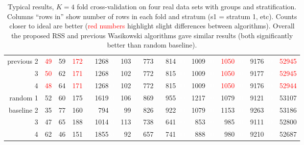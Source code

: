 \documentclass[twoside]{article}
\begin{document}
\begin{table}[ht]
\begin{tabular}{|r|rr|rr|rrrrr|rr|}
  previous 2 & \textcolor{red}{49} & 59 & \textcolor{red}{172}\textcolor{white}{.0} & 1268\textcolor{white}{.0} & 103\textcolor{white}{.0} & 773\textcolor{white}{.0} & 814\textcolor{white}{.00} & 1009\textcolor{white}{.00} & \textcolor{red}{1050}\textcolor{white}{.00} & 9176\textcolor{white}{.00} & \textcolor{red}{52945} \\ 
   3 & \textcolor{red}{50} & 62 & \textcolor{red}{171}\textcolor{white}{.0} & 1268\textcolor{white}{.0} & 102\textcolor{white}{.0} & 772\textcolor{white}{.0} & 815\textcolor{white}{.00} & 1009\textcolor{white}{.00} & \textcolor{red}{1050}\textcolor{white}{.00} & 9177\textcolor{white}{.00} & \textcolor{red}{52945} \\ 
   4 & \textcolor{red}{48} & 64 & \textcolor{red}{171}\textcolor{white}{.0} & 1268\textcolor{white}{.0} & 102\textcolor{white}{.0} & 772\textcolor{white}{.0} & 815\textcolor{white}{.00} & 1009\textcolor{white}{.00} & \textcolor{red}{1050}\textcolor{white}{.00} & 9176\textcolor{white}{.00} & \textcolor{red}{52944} \\ 
  \hline
  random 1 & 52 & 60 & 175\textcolor{white}{.0} & 1619\textcolor{white}{.0} & 106\textcolor{white}{.0} & 869\textcolor{white}{.0} & 955\textcolor{white}{.00} & 1217\textcolor{white}{.00} & 1079\textcolor{white}{.00} & 9121\textcolor{white}{.00} & 53107 \\ 
  baseline 2 & 35 & 77 & 160\textcolor{white}{.0} &  794\textcolor{white}{.0} &  99\textcolor{white}{.0} & 826\textcolor{white}{.0} & 922\textcolor{white}{.00} & 1079\textcolor{white}{.00} & 1153\textcolor{white}{.00} & 9263\textcolor{white}{.00} & 53186 \\ 
   3 & 47 & 65 & 188\textcolor{white}{.0} & 1014\textcolor{white}{.0} & 113\textcolor{white}{.0} & 738\textcolor{white}{.0} & 641\textcolor{white}{.00} &  853\textcolor{white}{.00} &  985\textcolor{white}{.00} & 9111\textcolor{white}{.00} & 52800 \\ 
   4 & 62 & 46 & 151\textcolor{white}{.0} & 1855\textcolor{white}{.0} &  92\textcolor{white}{.0} & 657\textcolor{white}{.0} & 741\textcolor{white}{.00} &  888\textcolor{white}{.00} &  980\textcolor{white}{.00} & 9210\textcolor{white}{.00} & 52687 \\ 
   \hline
\end{tabular}
\caption{
  \label{tab:results}
  Typical results, $K=4$ fold cross-validation on four real data sets with groups and stratification.
  Columns ``rows in'' show number of rows in each fold and stratum (s1 = stratum 1, etc).
  Counts closer to ideal are better (\textcolor{red}{red numbers} highlight slight differences between algorithms).
  Overall the proposed RSS and previous Wasikowski algorithms gave similar results (both significantly better than random baseline).
}
\end{table}
\end{document}
